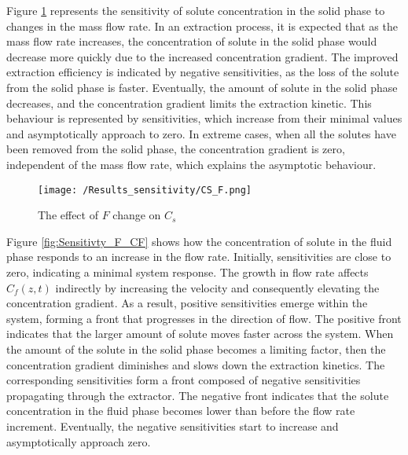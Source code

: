 \documentclass[../Article_Sensitivity_Analsysis.tex]{subfiles}
\begin{document}
   Figure \ref{fig:Sensitivty_F_CS} represents the sensitivity of solute concentration in the solid phase to changes in the mass flow rate. In an extraction process, it is expected that as the mass flow rate increases, the concentration of solute in the solid phase would decrease more quickly due to the increased concentration gradient. The improved extraction efficiency is indicated by negative sensitivities, as the loss of the solute from the solid phase is faster. Eventually, the amount of solute in the solid phase decreases, and the concentration gradient limits the extraction kinetic. This behaviour is represented by sensitivities, which increase from their minimal values and asymptotically approach to zero. In extreme cases, when all the solutes have been removed from the solid phase, the concentration gradient is zero, independent of the mass flow rate, which explains the asymptotic behaviour.
   
    
    \begin{figure}[h!]
    	\centering
    	\texttt{[image: /Results\_sensitivity/CS\_F.png]}
    	\caption{The effect of $F$ change on $C_s$}
    	\label{fig:Sensitivty_F_CS}
    \end{figure}
    
    Figure \ref{fig:Sensitivty_F_CF} shows how the concentration of solute in the fluid phase responds to an increase in the flow rate. Initially, sensitivities are close to zero, indicating a minimal system response. The growth in flow rate affects $C_f(z,t)$ indirectly by increasing the velocity and consequently elevating the concentration gradient. As a result, positive sensitivities emerge within the system, forming a front that progresses in the direction of flow. The positive front indicates that the larger amount of solute moves faster across the system. When the amount of the solute in the solid phase becomes a limiting factor, then the concentration gradient diminishes and slows down the extraction kinetics. The corresponding sensitivities form a front composed of negative sensitivities propagating through the extractor. The negative front indicates that the solute concentration in the fluid phase becomes lower than before the flow rate increment. Eventually, the negative sensitivities start to increase and asymptotically approach zero.
    
\end{document}
